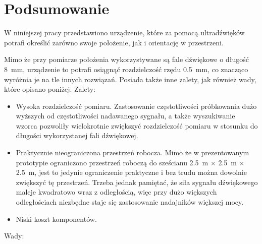 \chapter{Podsumowanie}

W niniejszej pracy przedstawiono urządzenie, które za pomocą ultradźwięków  potrafi określić zarówno swoje
położenie, jak i orientację w przestrzeni.

Mimo że przy pomiarze położenia wykorzystywane są fale dźwiękowe o długość \SI{8}{mm}, urządzenie to
potrafi osiągnąć rozdzielczość  rzędu \SI{0,5}{mm}, co znacząco wyróżnia je na tle innych rozwiązań.
Posiada także inne zalety, jak również wady, które opisano poniżej.
\newline
Zalety:
\begin{itemize}
 \item Wysoka rozdzielczość pomiaru. Zastosowanie częstotliwości 
 próbkowania dużo wyższych od częstotliwości nadawanego sygnału, a także wyszukiwanie wzorca pozwoliły
 wielokrotnie zwiększyć rozdzielczość pomiaru w stosunku do długości wykorzystanej fali dźwiękowej.
 
 \item Praktycznie nieograniczona przestrzeń robocza. Mimo że w prezentowanym prototypie
 ograniczono przestrzeń roboczą do sześcianu \SI{2,5}{m} $\times$ \SI{2,5}{m} $\times$ \SI{2,5}{m},
 jest to jedynie ograniczenie praktyczne i bez trudu można dowolnie zwiększyć tę przestrzeń. Trzeba jednak 
 pamiętać, że siła sygnału dźwiękowego maleje kwadratowo wraz z odległością, więc przy dużo większych odległościach
 niezbędne staje się zastosowanie nadajników większej mocy. 
 
 \item Niski koszt komponentów.
\end{itemize}
Wady:
